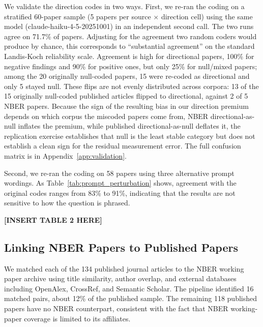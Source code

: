 \documentclass[12pt]{article}
\begin{document}
We validate the direction codes in two ways.  First, we re-ran the coding on
a stratified 60-paper sample (5 papers per source $\times$ direction cell)
using the same model (claude-haiku-4-5-20251001) in an independent second
call.  The two runs agree on 71.7\% of papers.  Adjusting for the agreement
two random coders would produce by chance, this corresponds to
``substantial agreement'' on the standard Landis-Koch reliability
scale.  Agreement is high for directional papers, 100\%
for negative findings and 90\% for positive ones, but only 25\% for
null/mixed papers; among the 20 originally null-coded papers, 15 were
re-coded as directional and only 5 stayed null.  These flips are not evenly
distributed across corpora: 13 of the 15 originally null-coded published
articles flipped to directional, against 2 of 5 NBER papers.  Because the
sign of the resulting bias in our direction premium depends on which corpus
the miscoded papers come from, NBER directional-as-null inflates the
premium, while published directional-as-null deflates it, the replication
exercise establishes that null is the least stable category but does
not establish a clean sign for the residual measurement error.  The
full confusion matrix is in Appendix~\ref{app:validation}.

Second, we re-ran the coding on 58 papers using three alternative
prompt wordings.  As Table~\ref{tab:prompt_perturbation} shows, agreement with the
original codes ranges from 83\% to 91\%, indicating that the
results are not sensitive to how the question is phrased.


\begin{center}
\textbf{[INSERT TABLE 2 HERE]}
\end{center}

\subsection{Linking NBER Papers to Published Papers}
\label{subsec:linking}

We matched each of the 134 published journal articles to the NBER working
paper archive using title similarity, author overlap, and external
databases including OpenAlex, CrossRef, and Semantic Scholar.  The
pipeline identified 16 matched pairs, about 12\% of the published
sample.  The remaining 118 published papers have no NBER counterpart,
consistent with the fact that NBER working-paper coverage is
limited to its affiliates.
\end{document}
